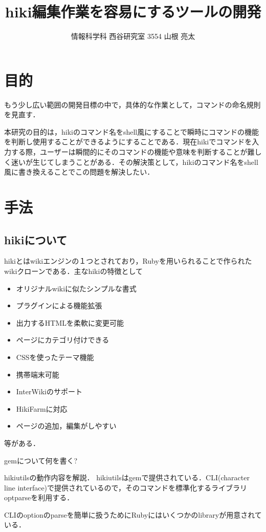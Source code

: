 \documentclass[a4j,twocolumn]{jsarticle}
\begin{document}
\title{hiki編集作業を容易にするツールの開発}
\author{情報科学科 西谷研究室 3554 山根 亮太}
\date{}
\maketitle
\section{目的}

もう少し広い範囲の開発目標の中で，具体的な作業として，コマンドの命名規則を見直す．

本研究の目的は，hikiのコマンド名をshell風にすることで瞬時にコマンドの機能を判断し使用することができるようにすることである．現在hikiでコマンドを入力する際，ユーザーは瞬間的にそのコマンドの機能や意味を判断することが難しく迷いが生じてしまうことがある．その解決策として，hikiのコマンド名をshell風に書き換えることでこの問題を解決したい．

\section{手法}
\subsection{hikiについて}
hikiとはwikiエンジンの１つとされており，Rubyを用いられることで作られたwikiクローンである．主なhikiの特徴として
\begin{itemize}
\item オリジナルwikiに似たシンプルな書式
\item プラグインによる機能拡張
\item 出力するHTMLを柔軟に変更可能
\item ページにカテゴリ付けできる
\item CSSを使ったテーマ機能
\item 携帯端末可能
\item InterWikiのサポート
\item HikiFarmに対応
\item ページの追加，編集がしやすい
\end{itemize}
等がある\cite{hiki}．

gemについて何を書く?　

hikiutilsの動作内容を解説．
hikiutilsはgemで提供されている．CLI(character line interface)で提供されているので，そのコマンドを標準化するライブラリoptparseを利用する．

CLIのoptionのparseを簡単に扱うためにRubyにはいくつかのlibraryが用意されている．
\end{document}
